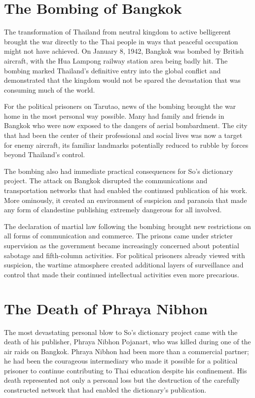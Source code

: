 \documentclass[
  Letterpaper,
]{scrbook}
\begin{document}
\section{The Bombing of Bangkok}\label{the-bombing-of-bangkok}

The transformation of Thailand from neutral kingdom to active
belligerent brought the war directly to the Thai people in ways that
peaceful occupation might not have achieved. On January 8, 1942, Bangkok
was bombed by British aircraft, with the Hua Lampong railway station
area being badly hit. The bombing marked Thailand's definitive entry
into the global conflict and demonstrated that the kingdom would not be
spared the devastation that was consuming much of the world.

For the political prisoners on Tarutao, news of the bombing brought the
war home in the most personal way possible. Many had family and friends
in Bangkok who were now exposed to the dangers of aerial bombardment.
The city that had been the center of their professional and social lives
was now a target for enemy aircraft, its familiar landmarks potentially
reduced to rubble by forces beyond Thailand's control.

The bombing also had immediate practical consequences for So's
dictionary project. The attack on Bangkok disrupted the communications
and transportation networks that had enabled the continued publication
of his work. More ominously, it created an environment of suspicion and
paranoia that made any form of clandestine publishing extremely
dangerous for all involved.

The declaration of martial law following the bombing brought new
restrictions on all forms of communication and commerce. The prisons
came under stricter supervision as the government became increasingly
concerned about potential sabotage and fifth-column activities. For
political prisoners already viewed with suspicion, the wartime
atmosphere created additional layers of surveillance and control that
made their continued intellectual activities even more precarious.

\section{The Death of Phraya Nibhon}\label{the-death-of-phraya-nibhon}

The most devastating personal blow to So's dictionary project came with
the death of his publisher, Phraya Nibhon Pojanart, who was killed
during one of the air raids on Bangkok. Phraya Nibhon had been more than
a commercial partner; he had been the courageous intermediary who made
it possible for a political prisoner to continue contributing to Thai
education despite his confinement. His death represented not only a
personal loss but the destruction of the carefully constructed network
that had enabled the dictionary's publication.
\end{document}
